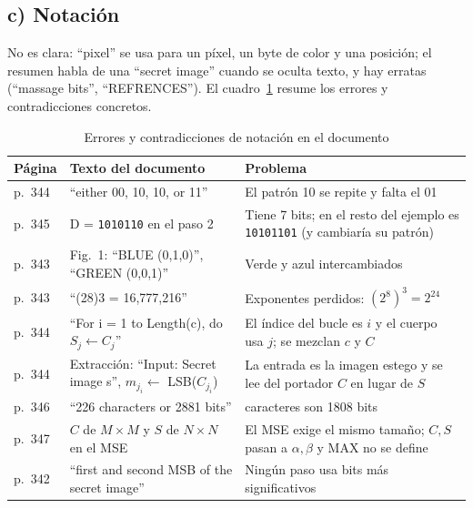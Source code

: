 \subsection{c) Notación}

No es clara: ``pixel'' se usa para un píxel, un byte de color y una posición; el resumen habla de una ``secret image'' cuando se oculta texto, y
hay erratas (``massage bits'', ``REFRENCES''). El cuadro~\ref{tab:q1-errores} resume los errores y contradicciones concretos.

\begin{table}[htbp]
\centering
\footnotesize
\renewcommand{\arraystretch}{1.15}
\begin{tabularx}{\textwidth}{@{}>{\raggedright\arraybackslash}p{1.4cm}>{\raggedright\arraybackslash}X>{\raggedright\arraybackslash}X@{}}
\toprule
Página & Texto del documento & Problema \\
\midrule
p.~344 & ``either 00, 10, 10, or 11'' & El patrón 10 se repite y falta el 01 \\
p.~345 & D = \texttt{1010110} en el paso 2 & Tiene 7 bits; en el resto del ejemplo es \texttt{10101101} (y cambiaría su patrón) \\
p.~343 & Fig.~1: ``BLUE (0,1,0)'', ``GREEN (0,0,1)'' & Verde y azul intercambiados \\
p.~343 & ``(28)3 = 16,777,216'' & Exponentes perdidos: $(2^8)^3 = 2^{24}$ \\
p.~344 & ``For i = 1 to Length(c), do $S_j \leftarrow C_j$'' & El índice del bucle es $i$ y el cuerpo usa $j$; se mezclan $c$ y $C$ \\
p.~344 & Extracción: ``Input: Secret image s'', $m_{j_i} \leftarrow$ LSB($C_{j_i}$) & La entrada es la imagen estego y se lee del portador $C$ en lugar de $S$ \\
p.~346 & ``226 characters or 2881 bits'' & 226 caracteres son 1808 bits \\
p.~347 & $C$ de $M\times M$ y $S$ de $N\times N$ en el MSE & El MSE exige el mismo tamaño; $C,S$ pasan a $\alpha,\beta$ y MAX no se define \\
p.~342 & ``first and second MSB of the secret image'' & Ningún paso usa bits más significativos \\
\bottomrule
\end{tabularx}
\caption{Errores y contradicciones de notación en el documento}
\label{tab:q1-errores}
\end{table}
